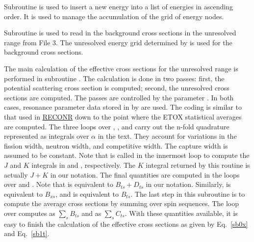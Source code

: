 Subroutine  is used to insert
a new energy into a list of energies in ascending order.  It is used
to manage the accumulation of the grid of energy nodes.

Subroutine  is used to read
in the background cross sections in the unresolved range from File 3.
The unresolved energy grid determined by
 is used
for the background cross sections.

The main calculation of the effective cross sections for the
unresolved range is performed in subroutine
.
The calculation is done in two passes: first, the potential
scattering cross section is computed; second, the unresolved
cross sections are computed.  The passes are controlled by
the parameter .  In both cases, resonance parameter
data stored in  by  are used.  The
coding is similar to that used in \hyperlink{sRECONRhy}{RECONR} down
to the point
where the ETOX statistical averages are computed.  The three
loops over , , and  carry out
the n-fold quadrature represented as integrals over $\alpha$
in the text.  They account for variations in the fission width,
neutron width, and competitive width.  The capture width is
assumed to be constant.  Note that
 is called in
the innermost loop to compute the $J$ and $K$ integrals in
 and , respectively.  The $K$ integral
returned by this routine is actually $J+K$ in our notation.
The final quantities are computed in the loops over
 and .  Note that  is
equivalent to $B_{ts}+D_{ts}$ in our notation.  Similarly,
 is equivalent to $B_{xs}$, and  is
equivalent to $B_{ts}$.  The last step in this subroutine is
to compute the average cross sections by summing over spin
sequences.  The loop over  computes  as
$\sum_s B_{ts}$ and  as $\sum_s C_{ts}$.  With these
quantities available, it is easy to finish the calculation of
the effective cross sections as given by Eq.~\ref{sb0x}
and Eq.~\ref{sb1t}.

